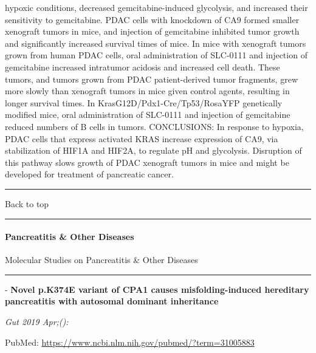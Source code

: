 \documentclass[]{article}
\let\oldparagraph\paragraph
\renewcommand{\paragraph}[1]{\oldparagraph{#1}\mbox{}}
\begin{document}
hypoxic conditions, decreased gemcitabine-induced glycolysis, and
increased their sensitivity to gemcitabine. PDAC cells with knockdown of
CA9 formed smaller xenograft tumors in mice, and injection of
gemcitabine inhibited tumor growth and significantly increased survival
times of mice. In mice with xenograft tumors grown from human PDAC
cells, oral administration of SLC-0111 and injection of gemcitabine
increased intratumor acidosis and increased cell death. These tumors,
and tumors grown from PDAC patient-derived tumor fragments, grew more
slowly than xenograft tumors in mice given control agents, resulting in
longer survival times. In KrasG12D/Pdx1-Cre/Tp53/RosaYFP genetically
modified mice, oral administration of SLC-0111 and injection of
gemcitabine reduced numbers of B cells in tumors. CONCLUSIONS: In
response to hypoxia, PDAC cells that express activated KRAS increase
expression of CA9, via stabilization of HIF1A and HIF2A, to regulate pH
and glycolysis. Disruption of this pathway slows growth of PDAC
xenograft tumors in mice and might be developed for treatment of
pancreatic cancer.

{}

{}

\begin{center}\rule{0.5\linewidth}{\linethickness}\end{center}

Back to top

\begin{center}\rule{0.5\linewidth}{\linethickness}\end{center}

\pagebreak

\hypertarget{pancreatitis-other-diseases}{%
\paragraph{Pancreatitis \& Other
Diseases}\label{pancreatitis-other-diseases}}

Molecular Studies on Pancreatitis \& Other Diseases

\begin{center}\rule{0.5\linewidth}{\linethickness}\end{center}

 - \textbf{Novel p.K374E variant of CPA1 causes misfolding-induced
hereditary pancreatitis with autosomal dominant inheritance}

\emph{Gut 2019 Apr;():}

PubMed: \url{https://www.ncbi.nlm.nih.gov/pubmed/?term=31005883}
\end{document}
